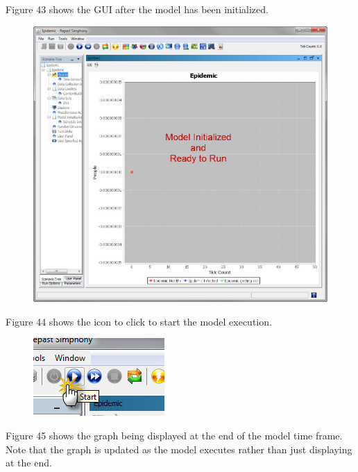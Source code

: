 \documentclass[11pt]{amsart}
\begin{document}
Figure 43 shows the GUI after the model has been initialized.


\begin{figure}[ht]
\begin{center}
\vspace{.2in}
\centerline {
\includegraphics[totalheight=0.3\textheight]{images/041.jpg}
}
\caption{}
\label{fig:041}
\end{center}
\end{figure}

Figure 44 shows the icon to click to start the model execution.


\begin{figure}[ht]
\begin{center}
\vspace{.2in}
\centerline {
\includegraphics[totalheight=0.3\textheight]{images/042.jpg}
}
\caption{}
\label{fig:042}
\end{center}
\end{figure}

Figure 45 shows the graph being displayed at the end of the model time frame. Note that the graph is updated as the model executes rather than just displaying at the end.
\end{document}
